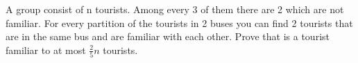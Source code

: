 A group consist of n tourists. Among every 3 of them there are 2 which are not familiar. For every partition of the tourists in 2 buses you can find 2 tourists that are in the same bus and are familiar with each other. Prove that is a tourist familiar to at most $\displaystyle \frac 2{5}n$ tourists.